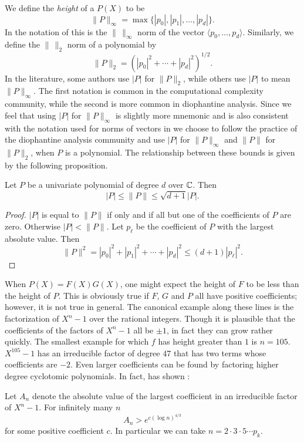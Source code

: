 We define the {\em height} of a $P(X)$ to be 
\[
\|P \|_{\infty} = 
  \max \{\left|p_{0}\right|, \left|p_{1}\right|, \ldots, \left|p_{d}\right|\}.
\]
In the notation of  this is the $\|\,\|_{\infty}$ norm
of the vector $\langle p_{0},\ldots, p_{d}\rangle$.  Similarly, we define the
$\|\,\|_{2}$ norm of a polynomial by
\[
\|P \|_{2} = \left(\left|p_{0}\right|^{2} + \cdots +
    \left|p_{d}\right|^{2}\right)^{1/2}.
\]
In the literature, some authors use $|P|$ for $\|P\|_{2}$, while
others use $|P|$ to mean $\|P\|_{\infty}$.  The first notation is
common in the computational complexity community, while the second is
more common in diophantine analysis.  Since we feel that using $|P|$
for $\|P\|_{\infty}$ is slightly more mnemonic and is also consistent
with the notation used for norms of vectors in 
we choose to follow the practice of the diophantine analysis community
and use $|P|$ for $\|P\|_{\infty}$ and $\|P\|$ for $\|P\|_{2}$, when
$P$ is a polynomial.  The relationship between these bounds is given
by the following proposition.

\begin{proposition}\label{PB:HeightRel:Prop}
Let $P$ be a univariate polynomial of degree $d$ over $\mathbb{C}$.  Then
\[
|P| \le \|P\| \le \sqrt{d+1} |P|.
\]
\end{proposition}

\begin{proof}
$|P|$ is equal to $\|P\|$ if only and if all but one of the coefficients
of $P$ are zero.  Otherwise $|P| < \|P\|$.  Let $p_{\ell}$ be the
coefficient of $P$ with the largest absolute value. Then
\[
\|P\|^2 = |p_0|^2 + |p_1|^2 + \cdots + |p_d|^2 \le (d+1) |p_{\ell}|^2.
\]
\end{proof}

When $P(X) = F(X) G(X)$, one might expect the height of $F$ to be less
than the height of $P$.  This is obviously true if $F$, $G$ and $P$
all have positive coefficients; however, it is not true in general.
The canonical example along these lines is the factorization of
$X^{n}-1$ over the rational integers.  Though it is plausible that the
coefficients of the factors of $X^{n}-1$ all be $\pm1$, in fact they
can grow rather quickly. The smallest example for which $f$ has height
greater than $1$ is $n=105$.  $X^{105}-1$ has an irreducible factor of
degree $47$ that has two terms whose coefficients are $-2$.  Even
larger coefficients can be found by factoring higher degree cyclotomic
polynomials. In fact, {\Erdos} has shown \cite{Erdos46}:
\begin{proposition} [\Erdos]
Let $A_n$ denote the absolute value of the largest coefficient in an
irreducible factor of $X^n -1$.  For infinitely many $n$
\[
A_n > e^{c (\log n)^{4/3}}
\]
for some positive coefficient $c$.  In particular we can take $n = 2
\cdot 3 \cdot 5 \cdots p_k$.
\end{proposition}

